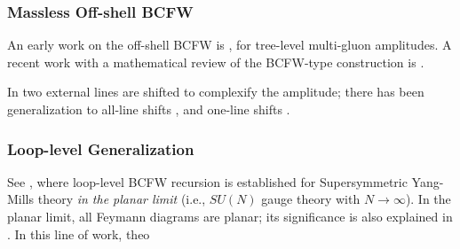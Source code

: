 \subsubsection{Massless Off-shell BCFW}

An early work on the off-shell BCFW is \autocite{vanHameren:2014iua}, for tree-level multi-gluon amplitudes. A recent work with a mathematical review of the BCFW-type construction is \autocite{Cohen:2024xuf}.

In \autocite{Britto:2005fq} two external lines are shifted to complexify the amplitude; there has been generalization to all-line shifts \autocite{Cohen:2010mi}, and one-line shifts \autocite {Cohen:2024xuf}.

\subsubsection{Loop-level Generalization}

See \autocite{Arkani-Hamed:2010zjl}, where loop-level BCFW recursion is established for Supersymmetric Yang-Mills theory \textit{in the planar limit} (i.e., $SU(N)$ gauge theory with $N \to \infty$). In the planar limit, all Feymann diagrams are planar; its significance is also explained in \autocite{Beisert:2010jr}. In this line of work, theo
